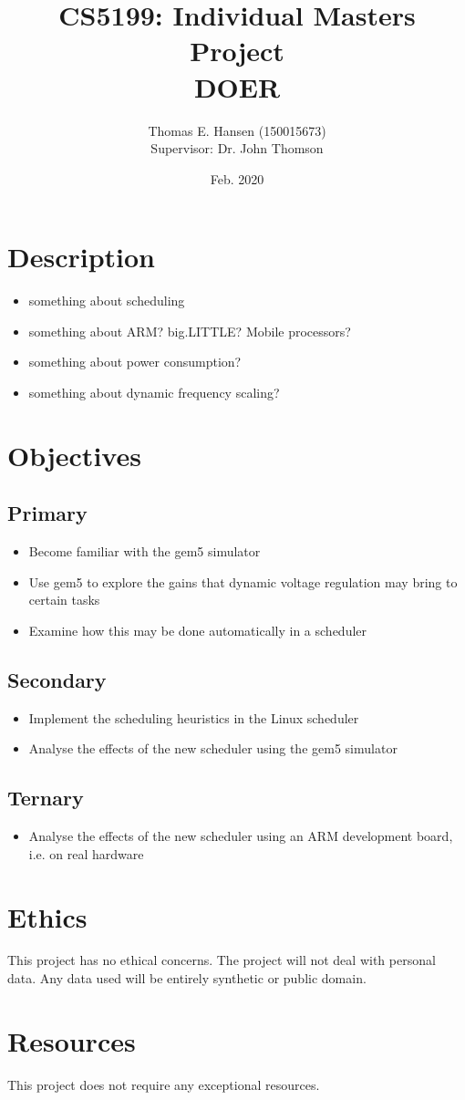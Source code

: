 \documentclass{article}
\title{CS5199: Individual Masters Project\\DOER}
\author{Thomas E. Hansen (150015673)\\Supervisor: Dr. John Thomson}
\date{Feb. 2020}
\begin{document}
    
    \maketitle
    
    \section{Description}
    \begin{itemize}
        \item something about scheduling
        \item something about ARM? big.LITTLE? Mobile processors?
        \item something about power consumption?
        \item something about dynamic frequency scaling?
    \end{itemize}
    
    \section{Objectives}
        \subsection{Primary}
        \begin{itemize}
            \item Become familiar with the gem5 simulator
            \item Use gem5 to explore the gains that dynamic voltage regulation
                  may bring to certain tasks
            \item Examine how this may be done automatically in a scheduler
        \end{itemize}
        
        \subsection{Secondary}
        \begin{itemize}
            \item Implement the scheduling heuristics in the Linux scheduler
            \item Analyse the effects of the new scheduler using the gem5
                  simulator
        \end{itemize}
        
        \subsection{Ternary}
        \begin{itemize}
            \item Analyse the effects of the new scheduler using an ARM
                  development board, i.e. on real hardware
        \end{itemize}
        
    \section{Ethics}
    This project has no ethical concerns. The project will not deal with
    personal data. Any data used will be entirely synthetic or public domain.
    
    \section{Resources}
    This project does not require any exceptional resources.
\end{document}
